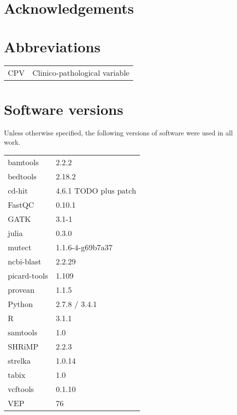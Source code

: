 \documentclass[a4paper]{report}
\begin{document}
\title{}
\author{Mark Pinese}
\date{}

\maketitle

\tableofcontents
\listoffigures
\listoftables

\chapter*{Acknowledgements}

\begin{abstract}
\end{abstract}


\chapter*{Abbreviations}

\begin{tabular}[c]{ l | l }
  CPV           & Clinico-pathological variable
\end{tabular}  


\chapter*{Software versions}
Unless otherwise specified, the following versions of software were used in all work.

\begin{tabular}{ll}
\toprule
  bamtools        & 2.2.2 \\
  bedtools        & 2.18.2 \\
  cd-hit          & 4.6.1 TODO plus patch \\
  FastQC          & 0.10.1 \\
  GATK            & 3.1-1 \\
  julia           & 0.3.0 \\
  mutect          & 1.1.6-4-g69b7a37 \\
  ncbi-blast      & 2.2.29 \\
  picard-tools    & 1.109 \\
  provean         & 1.1.5 \\
  Python          & 2.7.8 / 3.4.1 \\
  R               & 3.1.1 \\
  \quad 
  samtools        & 1.0 \\
  SHRiMP          & 2.2.3 \\
  strelka         & 1.0.14 \\
  tabix           & 1.0 \\
  vcftools        & 0.1.10 \\
  VEP             & 76 \\
\bottomrule
\end{tabular}










\end{document}
